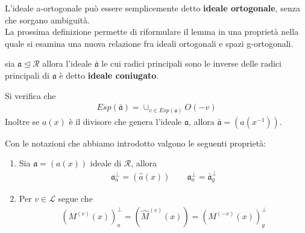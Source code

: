 L'ideale a-ortogonale può essere semplicemente detto {\bf ideale ortogonale}, senza che sorgano ambiguità. \\
La prossima definizione permette di riformulare il lemma in una proprietà nella quale si esamina una nuova relazione fra ideali ortogonali e spazi g-ortogonali.
\begin{definizione}
   sia $\mathfrak{a} \trianglelefteq \mathcal{R}$ allora l'ideale $\bar{\mathfrak{a}}$ le cui radici principali sono le inverse delle radici principali di $\mathfrak{a}$ è detto {\bf ideale coniugato}.
\end{definizione}
\begin{osservazione}
   Si verifica che 
   \begin{align*}
      Esp(\bar{\mathfrak{a}}) = \cup_{v \in Esp(\mathfrak{a}) } O(-v)
   \end{align*}
   Inoltre se $a(x)$ è il divisore che genera l'ideale $\mathfrak{a}$, allora $\bar{\mathfrak{a}} = (a(x^{-1}))$.
\end{osservazione}
\begin{prop}\label{prop:IdOrtogonali}
   Con le notazioni che abbiamo introdotto valgono le seguenti proprietà:
   \begin{enumerate}
      \item Sia $\mathfrak{a} = (a(x))$ ideale di $\mathcal{R}$, allora 
      \begin{align*}
         \mathfrak{a}_{a}^{\perp} = (\hat{a}(x)) \qquad  \mathfrak{a}_{a}^{\perp} = \bar{\mathfrak{a}}_{g}^{\perp}
      \end{align*}
      \item Per $v \in \mathscr{L}$ segue che
      \begin{align*}
           (M^{(v)}(x))_{a}^{\perp} = (\hat{M}^{(v)}(x)) = (M^{(-v)}(x))_{g}^{\perp}
      \end{align*}
   \end{enumerate}
\end{prop}
